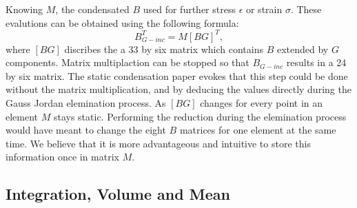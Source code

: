 Knowing $M$, the condensated $B$ used for further stress $\epsilon$ or
strain $\sigma$. These evalutions can be obtained using the following
formula:
\begin{equation}
  B^T_{G-inc}= M[B G]^T,
\end{equation}
where $[B G]$ discribes the a 33 by six matrix which contains $B$
extended by $G$ components. Matrix multiplaction can be stopped so
that $B_{G-inc}$ results in a 24 by six matrix. The static condensation
\cite{static-cond} paper evokes that this step could be done without
the matrix multiplication, and by deducing the values directly during
the Gauss Jordan elemination process. As $[B G]$ changes for every
point in an element $M$ stays static. Performing the reduction during
the elemination process would have meant to change the eight $B$
matrices for one element at the same time. We believe that it is more
advantageous and intuitive to store this information once in matrix
$M$.

\subsection{Integration, Volume and Mean}

